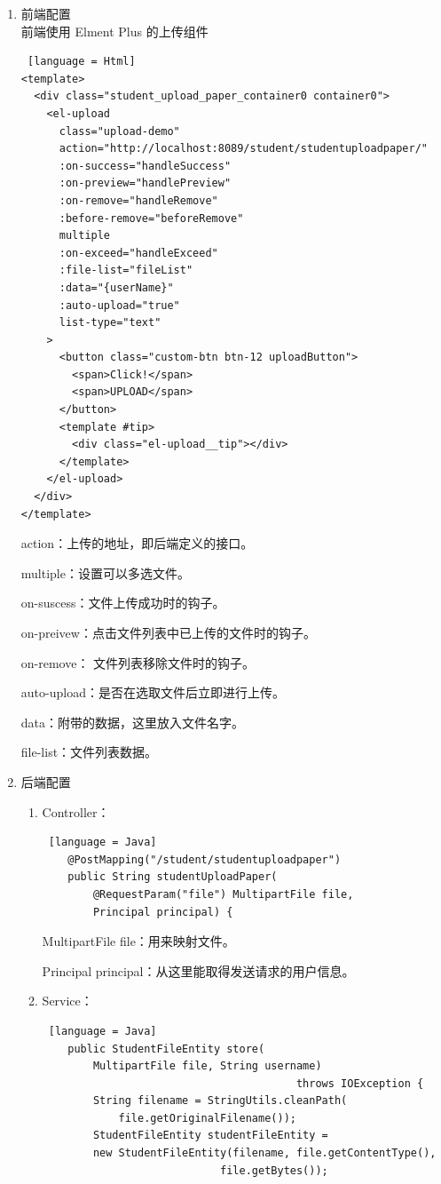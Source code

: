 \begin{enumerate}
  \item 前端配置\\
        前端使用 Elment Plus 的上传组件
        \begin{lstlisting} [language = Html]
<template>
  <div class="student_upload_paper_container0 container0">
    <el-upload
      class="upload-demo"
      action="http://localhost:8089/student/studentuploadpaper/"
      :on-success="handleSuccess"
      :on-preview="handlePreview"
      :on-remove="handleRemove"
      :before-remove="beforeRemove"
      multiple
      :on-exceed="handleExceed"
      :file-list="fileList"
      :data="{userName}"
      :auto-upload="true"
      list-type="text"
    >
      <button class="custom-btn btn-12 uploadButton">
        <span>Click!</span>
        <span>UPLOAD</span>
      </button>
      <template #tip>
        <div class="el-upload__tip"></div>
      </template>
    </el-upload>
  </div>
</template>
    \end{lstlisting}
        action：上传的地址，即后端定义的接口。

        multiple：设置可以多选文件。

        on-suscess：文件上传成功时的钩子。

        on-preivew：点击文件列表中已上传的文件时的钩子。

        on-remove：	文件列表移除文件时的钩子。

        auto-upload：是否在选取文件后立即进行上传。

        data：附带的数据，这里放入文件名字。

        file-list：文件列表数据。

  \item 后端配置
        \begin{enumerate}
          \item Controller：
                \begin{lstlisting} [language = Java]
    @PostMapping("/student/studentuploadpaper")
    public String studentUploadPaper(
        @RequestParam("file") MultipartFile file, 
        Principal principal) {
        \end{lstlisting}
                MultipartFile file：用来映射文件。

                Principal principal：从这里能取得发送请求的用户信息。
          \item Service：
                \begin{lstlisting} [language = Java]
    public StudentFileEntity store(
        MultipartFile file, String username) 
                                        throws IOException {
        String filename = StringUtils.cleanPath(
            file.getOriginalFilename());
        StudentFileEntity studentFileEntity = 
        new StudentFileEntity(filename, file.getContentType(), 
                            file.getBytes());


\end{lstlisting}
\end{enumerate}
\end{enumerate}
